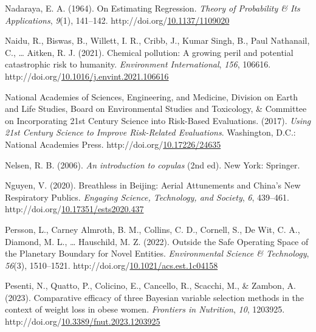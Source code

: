 \documentclass[12pt, twoside]{amherstthesis}
\newenvironment{CSLReferences}[2]%
  {}%
  {\par}
\begin{document}
\begin{CSLReferences}{1}{0}
\leavevmode{}%
Nadaraya, E. A. (1964). On {Estimating} {Regression}. \emph{Theory of Probability \& Its Applications}, \emph{9}(1), 141--142. http://doi.org/\href{https://doi.org/10.1137/1109020}{10.1137/1109020}

\leavevmode{}%
Naidu, R., Biswas, B., Willett, I. R., Cribb, J., Kumar Singh, B., Paul Nathanail, C., \ldots{} Aitken, R. J. (2021). Chemical pollution: {A} growing peril and potential catastrophic risk to humanity. \emph{Environment International}, \emph{156}, 106616. http://doi.org/\href{https://doi.org/10.1016/j.envint.2021.106616}{10.1016/j.envint.2021.106616}

\leavevmode{}%
National Academies of Sciences, Engineering, and Medicine, Division on Earth and Life Studies, Board on Environmental Studies and Toxicology, \& Committee on Incorporating 21st Century Science into Risk-Based Evaluations. (2017). \emph{Using 21st {Century} {Science} to {Improve} {Risk}-{Related} {Evaluations}}. Washington, D.C.: National Academies Press. http://doi.org/\href{https://doi.org/10.17226/24635}{10.17226/24635}

\leavevmode{}%
Nelsen, R. B. (2006). \emph{An introduction to copulas} (2nd ed). New York: Springer.

\leavevmode{}%
Nguyen, V. (2020). Breathless in {Beijing}: {Aerial} {Attunements} and {China}'s {New} {Respiratory} {Publics}. \emph{Engaging Science, Technology, and Society}, \emph{6}, 439--461. http://doi.org/\href{https://doi.org/10.17351/ests2020.437}{10.17351/ests2020.437}

\leavevmode{}%
Persson, L., Carney Almroth, B. M., Collins, C. D., Cornell, S., De Wit, C. A., Diamond, M. L., \ldots{} Hauschild, M. Z. (2022). Outside the {Safe} {Operating} {Space} of the {Planetary} {Boundary} for {Novel} {Entities}. \emph{Environmental Science \& Technology}, \emph{56}(3), 1510--1521. http://doi.org/\href{https://doi.org/10.1021/acs.est.1c04158}{10.1021/acs.est.1c04158}

\leavevmode{}%
Pesenti, N., Quatto, P., Colicino, E., Cancello, R., Scacchi, M., \& Zambon, A. (2023). Comparative efficacy of three {Bayesian} variable selection methods in the context of weight loss in obese women. \emph{Frontiers in Nutrition}, \emph{10}, 1203925. http://doi.org/\href{https://doi.org/10.3389/fnut.2023.1203925}{10.3389/fnut.2023.1203925}


\end{CSLReferences}
\end{document}
